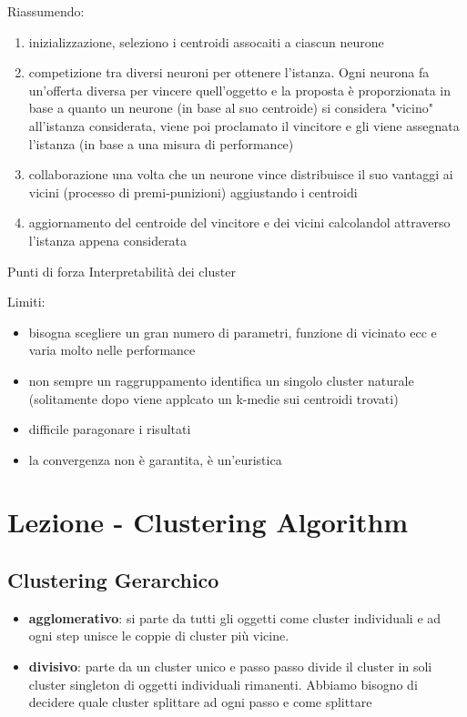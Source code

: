 Riassumendo:
\begin{enumerate}
	\item inizializzazione, seleziono i centroidi assocaiti a ciascun neurone
	\item competizione tra diversi neuroni per ottenere l'istanza. Ogni neurona fa un'offerta diversa per vincere quell'oggetto e la proposta \`e proporzionata in base a quanto un neurone (in base al suo centroide) si considera "vicino" all'istanza considerata, viene poi proclamato il vincitore e gli viene assegnata l'istanza (in base a una misura di performance)
	\item collaborazione una volta che un neurone vince distribuisce il suo vantaggi ai vicini (processo di premi-punizioni) aggiustando i centroidi
	\item aggiornamento del centroide del vincitore e dei vicini calcolandol attraverso l'istanza appena considerata
\end{enumerate} 

Punti di forza Interpretabilit\`a dei cluster 

Limiti:
\begin{itemize}
	\item bisogna scegliere un gran numero di parametri, funzione di vicinato ecc e varia molto nelle performance
	\item non sempre un raggruppamento identifica un singolo cluster naturale (solitamente dopo viene applcato un k-medie sui centroidi trovati)
	\item difficile paragonare i risultati
	\item la convergenza non \`e garantita, \`e un'euristica
\end{itemize}

\section{Lezione - Clustering Algorithm}

\subsection{Clustering Gerarchico}
\begin{itemize}
	\item \textbf{agglomerativo}: si parte da tutti gli oggetti come cluster individuali e ad ogni step unisce le coppie di cluster pi\`u vicine.
	\item \textbf{divisivo}: parte da un cluster unico e passo passo divide il cluster in soli cluster singleton di oggetti individuali rimanenti. Abbiamo bisogno di decidere quale cluster splittare ad ogni passo e come splittare
\end{itemize}

